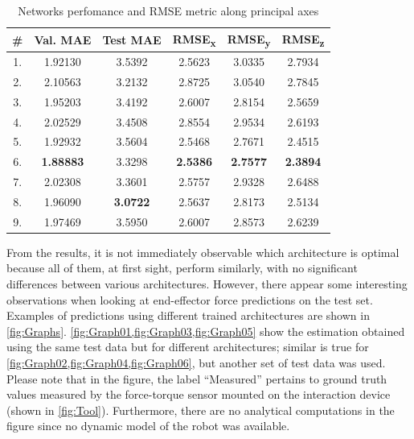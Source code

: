\begin{table}
    \caption{Networks perfomance and RMSE metric along principal axes}
    \label{tab:ResultsMover}
    \centering
    \begin{tabular}{cccccc}
        \toprule
        \textbf{\#} & \textbf{Val. MAE} & \textbf{Test MAE} & \textbf{RMSE\textsubscript{x}} & \textbf{RMSE\textsubscript{y}} & \textbf{RMSE\textsubscript{z}} \\
        \midrule
        1. & 1.92130 & 3.5392 & 2.5623 & 3.0335 & 2.7934\\
        2. & 2.10563 & 3.2132 & 2.8725 & 3.0540 & 2.7845\\
        3. & 1.95203 & 3.4192 & 2.6007 & 2.8154 & 2.5659\\
        4. & 2.02529 & 3.4508 & 2.8554 & 2.9534 & 2.6193 \\
        5. & 1.92932 & 3.5604 & 2.5468 & 2.7671 & 2.4515\\
        6. & \textbf{1.88883} & 3.3298 & \textbf{2.5386} & \textbf{2.7577} & \textbf{2.3894} \\
        7. & 2.02308 & 3.3601 & 2.5757 & 2.9328 & 2.6488 \\
        8. & 1.96090 & \textbf{3.0722} & 2.5637 & 2.8173 & 2.5134\\
        9. & 1.97469 & 3.5950 & 2.6007 & 2.8573 & 2.6239 \\
        \bottomrule
    \end{tabular}
\end{table}

From the results, it is not immediately observable which architecture is optimal because all of them, at first sight, perform similarly, with no significant differences between various architectures. However, there appear some interesting observations when looking at end-effector force predictions on the test set. Examples of predictions using different trained architectures are shown in \cref{fig:Graphs}. \cref{fig:Graph01,fig:Graph03,fig:Graph05} show the estimation obtained using the same test data but for different architectures; similar is true for \cref{fig:Graph02,fig:Graph04,fig:Graph06}, but another set of test data was used. Please note that in the figure, the label ``Measured'' pertains to ground truth values measured by the force-torque sensor mounted on the interaction device (shown in \cref{fig:Tool}). Furthermore, there are no analytical computations in the figure since no dynamic model of the robot was available.

